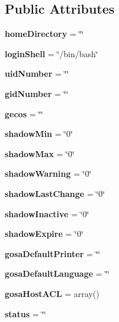 \subsection*{Public Attributes}
\begin{CompactItemize}
\item 
{\bf home\-Directory} = \char`\"{}\char`\"{}\label{classposixAccount_o0}

\item 
{\bf login\-Shell} = \char`\"{}/bin/bash\char`\"{}\label{classposixAccount_o1}

\item 
{\bf uid\-Number} = \char`\"{}\char`\"{}\label{classposixAccount_o2}

\item 
{\bf gid\-Number} = \char`\"{}\char`\"{}\label{classposixAccount_o3}

\item 
{\bf gecos} = \char`\"{}\char`\"{}\label{classposixAccount_o4}

\item 
{\bf shadow\-Min} = \char`\"{}0\char`\"{}\label{classposixAccount_o5}

\item 
{\bf shadow\-Max} = \char`\"{}0\char`\"{}\label{classposixAccount_o6}

\item 
{\bf shadow\-Warning} = \char`\"{}0\char`\"{}\label{classposixAccount_o7}

\item 
{\bf shadow\-Last\-Change} = \char`\"{}0\char`\"{}\label{classposixAccount_o8}

\item 
{\bf shadow\-Inactive} = \char`\"{}0\char`\"{}\label{classposixAccount_o9}

\item 
{\bf shadow\-Expire} = \char`\"{}0\char`\"{}\label{classposixAccount_o10}

\item 
{\bf gosa\-Default\-Printer} = \char`\"{}\char`\"{}\label{classposixAccount_o11}

\item 
{\bf gosa\-Default\-Language} = \char`\"{}\char`\"{}\label{classposixAccount_o12}

\item 
{\bf gosa\-Host\-ACL} = array()\label{classposixAccount_o13}

\item 
{\bf status} = \char`\"{}\char`\"{}\label{classposixAccount_o14}


\end{CompactItemize}
